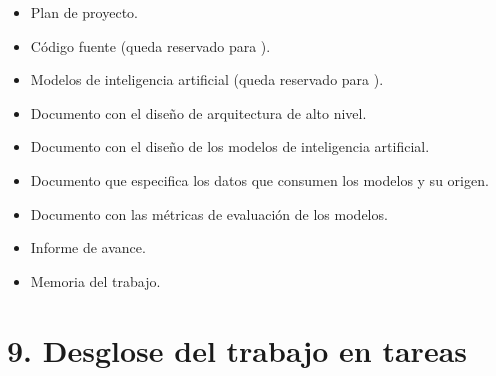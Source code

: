 \documentclass[
11pt, %
]{charter}
\begin{document}
\begin{itemize}
	\item Plan de proyecto.
	\item Código fuente (queda reservado para \empclientename).
	\item Modelos de inteligencia artificial (queda reservado para \empclientename).
	\item Documento con el diseño de arquitectura de alto nivel.
	\item Documento con el diseño de los modelos de inteligencia artificial.
	\item Documento que especifica los datos que consumen los modelos y su origen.
	\item Documento con las métricas de evaluación de los modelos.
	\item Informe de avance.
	\item Memoria del trabajo.
\end{itemize}


\section{9. Desglose del trabajo en tareas}
\label{sec:wbs}
\end{document}

